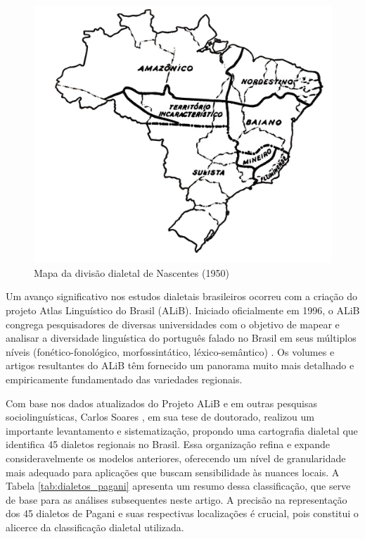 \begin{figure}[ht]
  \centering
  \includegraphics[width=0.75\linewidth]{images/mapa4x.png}
  \caption{Mapa da divisão dialetal de Nascentes (1950)}
  \label{fig:mapa1950}
\end{figure}
Um avanço significativo nos estudos dialetais brasileiros ocorreu com a criação do projeto Atlas Linguístico do Brasil (ALiB). Iniciado oficialmente em 1996, o ALiB congrega pesquisadores de diversas universidades com o objetivo de mapear e analisar a diversidade linguística do português falado no Brasil em seus múltiplos níveis (fonético-fonológico, morfossintático, léxico-semântico) \cite{cardoso2014alib, Aguilera2022}. Os volumes e artigos resultantes do ALiB têm fornecido um panorama muito mais detalhado e empiricamente fundamentado das variedades regionais.

Com base nos dados atualizados do Projeto ALiB e em outras pesquisas sociolinguísticas, Carlos Soares \cite{pagani2022}, em sua tese de doutorado, realizou um importante levantamento e sistematização, propondo uma cartografia dialetal que identifica 45 dialetos regionais no Brasil. Essa organização refina e expande consideravelmente os modelos anteriores, oferecendo um nível de granularidade mais adequado para aplicações que buscam sensibilidade às nuances locais. A Tabela \ref{tab:dialetos_pagani} apresenta um resumo dessa classificação, que serve de base para as análises subsequentes neste artigo. A precisão na representação dos 45 dialetos de Pagani e suas respectivas localizações é crucial, pois constitui o alicerce da classificação dialetal utilizada.



